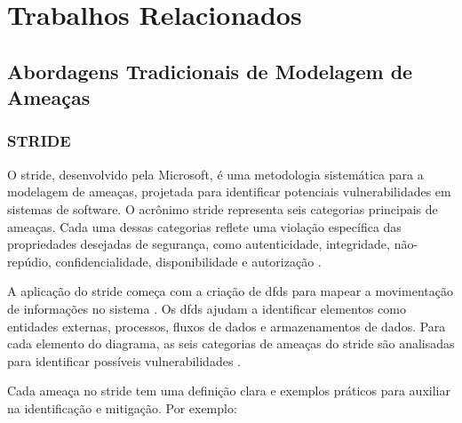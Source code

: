 
%

\chapter{Trabalhos Relacionados}
\label{cha:related_work}

\glsresetall

\section{Abordagens Tradicionais de Modelagem de Ameaças}
\label{sec:traditional_threat_modeling}

\subsection{STRIDE}
\label{subsec:stride}

O \gls{stride}, desenvolvido pela Microsoft, é uma metodologia sistemática
para a modelagem de ameaças, projetada para identificar potenciais
vulnerabilidades em sistemas de software. O acrônimo \gls{stride} representa
seis categorias principais de ameaças\cite{ThreatModelingdesigningForSecurity}.
Cada uma dessas categorias reflete uma violação específica das
propriedades desejadas de segurança, como autenticidade,
integridade, não-repúdio, confidencialidade, disponibilidade e autorização
\cite{MicrosoftThreatModelingTechnique}.

A aplicação do \gls{stride} começa com a criação de \gls{dfds}
para mapear a movimentação de informações no sistema
\cite{UncoverSecurityDesignFlawsSTRIDE}. Os \gls{dfds} ajudam a identificar
elementos como entidades externas, processos, fluxos de dados e
armazenamentos de dados. Para cada elemento do diagrama, as seis
categorias de ameaças do \gls{stride} são analisadas para identificar
possíveis vulnerabilidades \cite{ThreatModelingdesigningForSecurity}.

Cada ameaça no \gls{stride} tem uma definição clara e exemplos práticos para
auxiliar na identificação e mitigação. Por exemplo:

